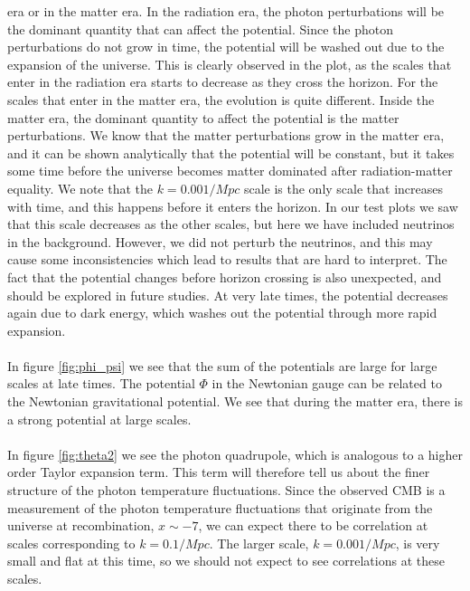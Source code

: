 \documentclass{aa}
\begin{document}
era or in the matter era. In the radiation era, the photon perturbations will be the dominant quantity that can affect the potential. 
Since the photon perturbations do not grow in time, the potential will be washed out due to the expansion of the universe.
This is clearly observed in the plot, as the scales that enter in the radiation era starts to decrease as they cross the horizon. For the scales that enter in 
the matter era, the evolution is quite different. Inside the matter era, the dominant quantity to affect the potential is the matter perturbations. We know that the matter
perturbations grow in the matter era, and it can be shown analytically that the potential will be constant, but it takes some time before the universe becomes
matter dominated after radiation-matter equality. We note that the $k = 0.001/Mpc$ scale is the only scale that
increases with time, and this happens before it enters the horizon. In our test plots we saw that this scale decreases as the other scales, but here we have included neutrinos in the background.
However, we did not perturb the neutrinos, and this may cause some inconsistencies which lead to results that are hard to interpret. The fact that the potential changes before horizon crossing is also unexpected, and should be explored in future studies.
At very late times, the potential decreases again due to dark energy,
which washes out the potential through more rapid expansion.\\
\\
In figure \ref{fig:phi_psi} we see that the sum of the potentials are large for large scales at late times. The potential $\Phi$ in the Newtonian gauge can be related 
to the Newtonian gravitational potential. We see that during the matter era, there is a strong potential at large scales.\\
\\
In figure \ref{fig:theta2} we see the photon quadrupole, which is analogous to a higher order Taylor expansion term. This term will therefore tell us about the 
finer structure of the photon temperature fluctuations. Since the observed CMB is a measurement of the photon temperature fluctuations that originate
from the universe at recombination, $x \sim -7$, we can expect there to be correlation at scales corresponding to $k = 0.1/Mpc$. The larger scale, $k = 0.001/Mpc$, 
is very small and flat at this time, so we should not expect to see correlations at these scales.    


\end{document}
